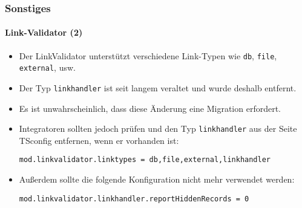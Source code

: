 %

\begin{frame}[fragile]
	\frametitle{Sonstiges}
	\framesubtitle{Link-Validator (2)}


	\begin{itemize}
		\item Der LinkValidator unterstützt verschiedene Link-Typen wie
			\small\texttt{db}\normalsize, \small\texttt{file}\normalsize,
			\small\texttt{external}\normalsize, usw.
		\item Der Typ \small\texttt{linkhandler}\normalsize
			ist seit langem veraltet und wurde deshalb entfernt.
		\item Es ist unwahrscheinlich, dass diese Änderung eine Migration erfordert.
		\item Integratoren sollten jedoch prüfen und den Typ \texttt{linkhandler}
			aus der Seite TSconfig entfernen, wenn er vorhanden ist:
\begin{lstlisting}
mod.linkvalidator.linktypes = db,file,external,linkhandler
\end{lstlisting}

		\item Außerdem sollte die folgende Konfiguration nicht mehr verwendet werden:
\begin{lstlisting}
mod.linkvalidator.linkhandler.reportHiddenRecords = 0
\end{lstlisting}

	\end{itemize}

\end{frame}

